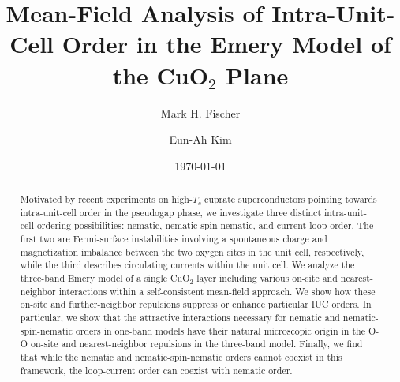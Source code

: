 \documentclass[prb, twocolumn,showpacs,preprintnumbers,amsmath,amssymb, floatfix]{revtex4}
\begin{document}
\newcommand{\kk}{{\bf k}}
\newcommand{\q}{{\bf q}}
\newcommand{\HH}{\mathcal{H}}

\title{Mean-Field Analysis of Intra-Unit-Cell Order in the Emery Model of the CuO$_2$ Plane}

\author{Mark H. Fischer}
\author{Eun-Ah Kim}
%

\date{\today}

\begin{abstract}
  Motivated by recent experiments on high-$T_c$ cuprate
  superconductors pointing towards
  intra-unit-cell order in the
  pseudogap phase, 
  we investigate three distinct intra-unit-cell-ordering possibilities: 
nematic, nematic-spin-nematic, and current-loop order.
The first two are Fermi-surface instabilities involving 
 a spontaneous charge and magnetization imbalance between the two oxygen sites in
 the unit cell, respectively, while the third describes circulating currents within the unit cell.
  We analyze the three-band Emery model of a
  single CuO$_2$ layer including various on-site and nearest-neighbor
  interactions within a self-consistent mean-field approach.
 We show how these on-site and further-neighbor
  repulsions suppress or enhance particular IUC orders.
  In particular, we show that the attractive interactions
  necessary for nematic and nematic-spin-nematic
  orders in one-band models have their natural
microscopic origin in the O-O on-site and nearest-neighbor repulsions
in the three-band model.
Finally, we find that while the nematic and nematic-spin-nematic orders 
cannot coexist in this framework, 
the loop-current order can coexist with nematic order.
\end{abstract}

\maketitle
\end{document}
